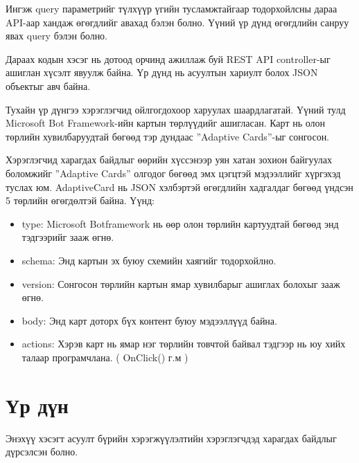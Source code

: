 Ингэж query параметрийг түлхүүр үгийн тусламжтайгаар тодорхойлсны дараа API-аар хандаж өгөгдлийг авахад бэлэн болно. Үүний үр дүнд өгөгдлийн санруу явах query бэлэн болно. 


Дараах кодын хэсэг нь дотоод орчинд ажиллаж буй REST API controller-ыг ашиглан хүсэлт явуулж байна. Үр дүнд нь асуултын хариулт болох JSON объектыг авч байна. 


Тухайн үр дүнгээ хэрэглэгчид ойлгогдохоор харуулах шаардлагатай. Үүний тулд Microsoft Bot Framework-ийн картын төрлүүдийг ашигласан. Карт нь олон төрлийн хувилбаруудтай бөгөөд тэр дундаас ”Adaptive Cards”-ыг сонгосон.


Хэрэглэгчид харагдах байдлыг өөрийн хүссэнээр уян хатан зохион байгуулах боломжийг ”Adaptive Cards” олгодог бөгөөд эмх цэгцтэй мэдээллийг хүргэхэд туслах юм. AdaptiveCard нь JSON хэлбэртэй өгөгдлийн хадгалдаг бөгөөд үндсэн 5 төрлийн өгөгдөлтэй байна. Үүнд:
\begin{itemize}
  \item type: Microsoft Botframework нь өөр олон төрлийн картуудтай бөгөөд энд тэдгээрийг зааж өгнө. 
  \item schema: Энд картын эх буюу схемийн хаягийг тодорхойлно.
  \item version: Сонгосон төрлийн картын ямар хувилбарыг ашиглах болохыг зааж өгнө.
  \item body: Энд карт доторх бүх контент буюу мэдээллүүд байна.
  \item actions: Хэрэв карт нь ямар нэг төрлийн товчтой байвал тэдгээр нь юу хийх талаар програмчлана. ( OnClick() г.м )
\end{itemize}

\section{Үр дүн}
Энэхүү хэсэгт асуулт бүрийн хэрэгжүүлэлтийн хэрэглэгчдэд харагдах байдлыг дүрсэлсэн болно. 
